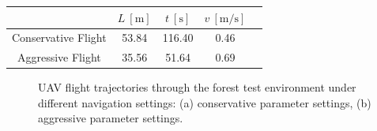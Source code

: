             \begin{table}[H]
                \centering
                \renewcommand{\arraystretch}{1.2}
                \begin{tabular}{|c|c|c|c|c|}
                \hline
                                    & \( L \ [\mathrm{m}] \) & \( t \ [\mathrm{s}] \) &  \( v \ [\mathrm{m/s}] \)     \\ \hline
                Conservative Flight & 53.84                   & 116.40                  &  0.46                          \\ \hline
                Aggressive Flight    & 35.56                   &  51.64                  &  0.69                          \\ \hline
                \end{tabular}
            \end{table}

            \begin{figure}[htbp]
                \centering
                \caption{
                    \ac{UAV} flight trajectories through the forest test environment under different navigation settings: (a) conservative parameter settings, (b) aggressive parameter settings.
                }
                \label{fig:rbl_forest_conservative_flight_path}
            \end{figure}

